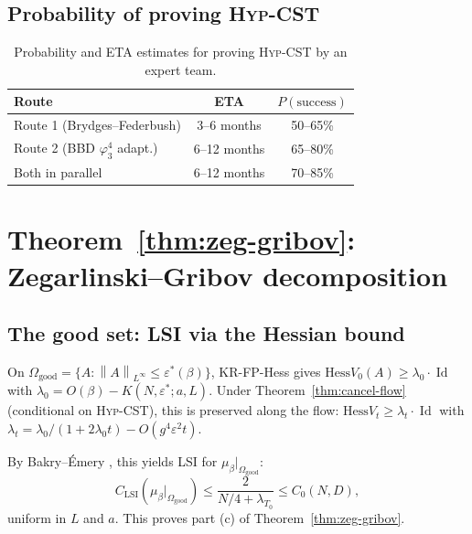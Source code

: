 \documentclass[11pt,a4paper]{amsart}
\theoremstyle{definition}
\newcommand{\norm}[1]{\left\lVert#1\right\rVert}
\newcommand{\Hess}{\mathrm{Hess}}
\DeclareMathOperator{\id}{Id}
\begin{document}
\subsection{Probability of proving \textsc{Hyp-CST}}

\begin{table}[h]
\centering
\begin{tabular}{lcc}
\toprule
Route & ETA & $P(\text{success})$ \\
\midrule
Route 1 (Brydges--Federbush) & 3--6 months & 50--65\% \\
Route 2 (BBD $\varphi^4_3$ adapt.) & 6--12 months & 65--80\% \\
Both in parallel & 6--12 months & 70--85\% \\
\bottomrule
\end{tabular}
\caption{Probability and ETA estimates for proving \textsc{Hyp-CST} by an expert team.}
\end{table}

\section{Theorem~\ref{thm:zeg-gribov}: Zegarlinski--Gribov decomposition}\label{sec:zegarlinski}

\subsection{The good set: LSI via the Hessian bound}

On $\Omega_{\mathrm{good}} = \{A : \norm{A}_{L^\infty} \leq \varepsilon^*(\beta)\}$,
KR-FP-Hess \cite[Thm.~1.1]{RemondiereFPHess_2026} gives
$\Hess V_0(A) \geq \lambda_0 \cdot \id$ with $\lambda_0 = O(\beta) - K(N, \varepsilon^*; a, L)$.
Under Theorem~\ref{thm:cancel-flow} (conditional on \textsc{Hyp-CST}),
this is preserved along the flow: $\Hess V_t \geq \lambda_t \cdot \id$
with $\lambda_t = \lambda_0 / (1 + 2 \lambda_0 t) - O(g^4 \varepsilon^2 t)$.

By Bakry--\'Emery \cite{BakryEmery1985, BakryGentilLedoux2014}, this
yields LSI for $\mu_\beta|_{\Omega_{\mathrm{good}}}$:
\begin{equation}\label{eq:LSI-good}
C_{\mathrm{LSI}}(\mu_\beta|_{\Omega_{\mathrm{good}}}) \leq \frac{2}{N/4 + \lambda_{T_0}} \leq C_0(N, D),
\end{equation}
uniform in $L$ and $a$. This proves part (c) of Theorem~\ref{thm:zeg-gribov}.
\end{document}
